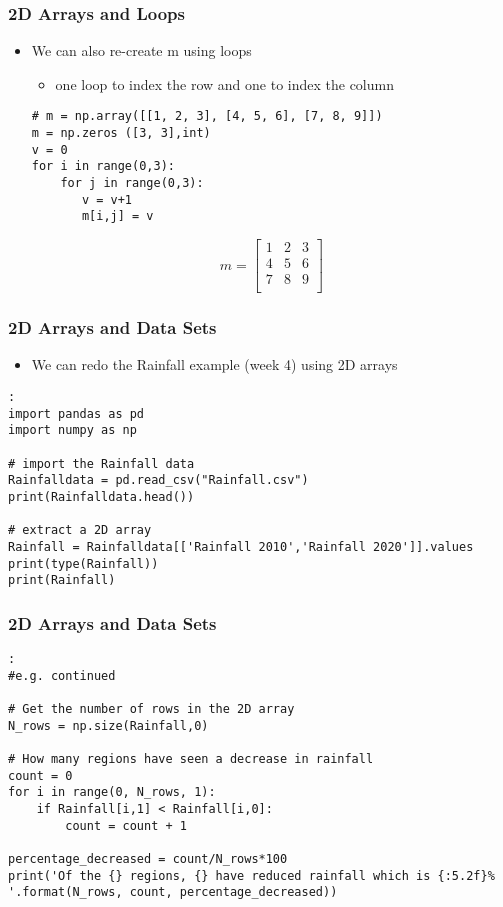 \documentclass[english,14pt]{beamer}
\begin{document}
\begin{frame}[fragile]
\frametitle{2D Arrays and Loops}
	\begin{itemize}
		\item We can also re-create m using loops
	  	\begin{itemize}
		    \item one loop to index the row and one to index the column
		\end{itemize}
\begin{lstlisting}[style=CStyle]
# m = np.array([[1, 2, 3], [4, 5, 6], [7, 8, 9]])
m = np.zeros ([3, 3],int)
v = 0
for i in range(0,3):
    for j in range(0,3):
       v = v+1
       m[i,j] = v
\end{lstlisting}
\[		
m = \left[ 
\begin{array}{ccc}
     1 & 2 & 3   \\
     4 & 5 & 6   \\
     7 & 8 & 9  \\     
\end{array} \right] 
\]
	\end{itemize}
\end{frame}






\begin{frame}[fragile]
\frametitle{2D Arrays and Data Sets}
	\begin{itemize}
		\item We can redo the Rainfall example (week 4) using 2D arrays 
	\end{itemize}
\begin{lstlisting}[style=CStyle]:
import pandas as pd
import numpy as np

# import the Rainfall data
Rainfalldata = pd.read_csv("Rainfall.csv")
print(Rainfalldata.head())

# extract a 2D array
Rainfall = Rainfalldata[['Rainfall 2010','Rainfall 2020']].values
print(type(Rainfall))
print(Rainfall)

\end{lstlisting}

\end{frame}


\begin{frame}[fragile]
\frametitle{2D Arrays and Data Sets}
\begin{lstlisting}[style=CStyle]:
#e.g. continued

# Get the number of rows in the 2D array
N_rows = np.size(Rainfall,0)

# How many regions have seen a decrease in rainfall
count = 0
for i in range(0, N_rows, 1):
    if Rainfall[i,1] < Rainfall[i,0]:
        count = count + 1

percentage_decreased = count/N_rows*100
print('Of the {} regions, {} have reduced rainfall which is {:5.2f}% '.format(N_rows, count, percentage_decreased))
\end{lstlisting}
\end{frame}
\end{document}
